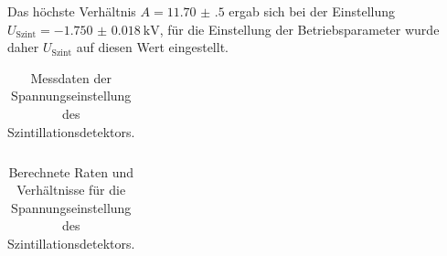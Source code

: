 Das höchste Verhältnis $A=\num{11.70(50)}$ ergab sich bei der Einstellung $U_\text{Szint}=\SI{-1.750(18)}{\kilo\V}$, für die Einstellung der Betriebsparameter wurde daher $U_\text{Szint}$ auf diesen Wert eingestellt.

\begin{table}[h]
    \centering
    \begin{tabular}{|c||c|c||c|c|} \hline
    
    \end{tabular}
    \caption{Messdaten der Spannungseinstellung des Szintillationsdetektors.}
    \label{tab:ratios_data}
\end{table}

\begin{table}[h]
    \centering
    \begin{tabular}{|c||c|c|c|} \hline
    
    \end{tabular}
    \caption{Berechnete Raten und Verhältnisse für die Spannungseinstellung des Szintillationsdetektors.}
    \label{tab:ratios}
\end{table}
